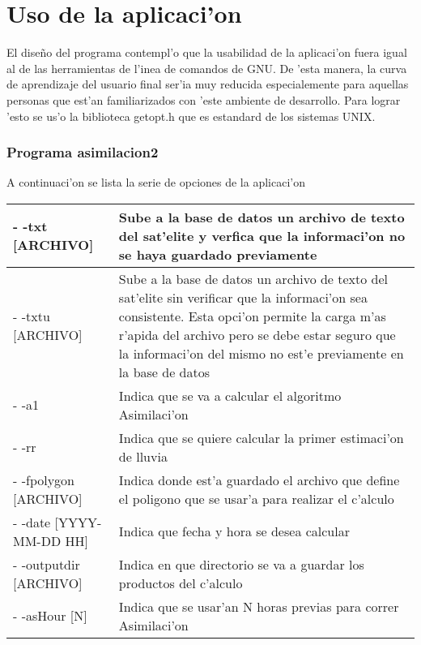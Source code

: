 \section{Uso de la aplicaci'on}

El dise\~no del programa contempl'o que la usabilidad de la aplicaci'on fuera igual al de las herramientas de l'inea de comandos de GNU.
De 'esta manera, la curva de aprendizaje del usuario final ser'ia muy reducida especialemente para aquellas personas que est'an 
familiarizados con 'este ambiente de desarrollo. Para lograr 'esto se us'o la biblioteca getopt.h que es estandard de los sistemas UNIX.


\subsubsection*{Programa asimilacion2}
A continuaci'on se lista la serie de opciones de la aplicaci'on
\begin{center}
  \begin{tabular}{|l|p{12cm}|}
  \hline
  - -txt [ARCHIVO] & Sube a la base de datos un archivo de texto del sat'elite y verfica que la 
		      informaci'on no se haya guardado previamente\\ \hline 
  - -txtu [ARCHIVO] & Sube a la base de datos un archivo de texto del sat'elite sin verificar que 
		      la informaci'on sea consistente. Esta opci'on permite la carga m'as r'apida del archivo pero se debe estar seguro que
		      la informaci'on del mismo no est'e previamente en la base de datos\\ \hline
  - -a1 & Indica que se va a calcular el algoritmo Asimilaci'on \\ \hline
  - -rr & Indica que se quiere calcular la primer estimaci'on de lluvia \\ \hline
  - -fpolygon [ARCHIVO] & Indica donde est'a guardado el archivo que define el poligono que se usar'a para realizar el c'alculo \\ \hline
  - -date [YYYY-MM-DD HH] & Indica que fecha y hora se desea calcular \\ \hline
  - -outputdir [ARCHIVO] & Indica en que directorio se va a guardar los productos del c'alculo \\ \hline
  - -asHour [N] & Indica que se usar'an N horas previas para correr Asimilaci'on \\ \hline 
  \end{tabular} 
\end{center}

